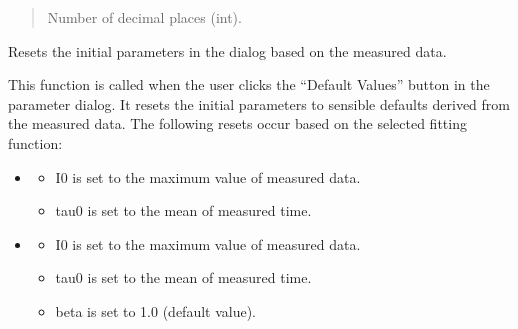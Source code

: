 \documentclass[letterpaper,10pt,english]{sphinxmanual}
\begin{document}
\begin{fulllineitems}
\begin{fulllineitems}
\begin{quote}
\begin{description}
\sphinxAtStartPar
Number of decimal places (int).

\end{description}\end{quote}

\end{fulllineitems}


\begin{fulllineitems}
\label{\detokenize{FLIMGraphics:FLIMGraphics.FLIMGraphic.resetInitialDialog}}
\pysigstartsignatures
{}
\pysigstopsignatures
\sphinxAtStartPar
Resets the initial parameters in the dialog based on the measured data.

\sphinxAtStartPar
This function is called when the user clicks the “Default Values” button in the parameter dialog. 
It resets the initial parameters to sensible defaults derived from the measured data. 
The following resets occur based on the selected fitting function:
\begin{itemize}
\item {} \begin{description}
\begin{itemize}
\item {} 
\sphinxAtStartPar
I0 is set to the maximum value of measured data.

\item {} 
\sphinxAtStartPar
tau0 is set to the mean of measured time.

\end{itemize}

\end{description}

\item {} \begin{description}
\begin{itemize}
\item {} 
\sphinxAtStartPar
I0 is set to the maximum value of measured data.

\item {} 
\sphinxAtStartPar
tau0 is set to the mean of measured time.

\item {} 
\sphinxAtStartPar
beta is set to 1.0 (default value).


\end{itemize}
\end{description}
\end{itemize}
\end{fulllineitems}
\end{fulllineitems}
\end{document}

